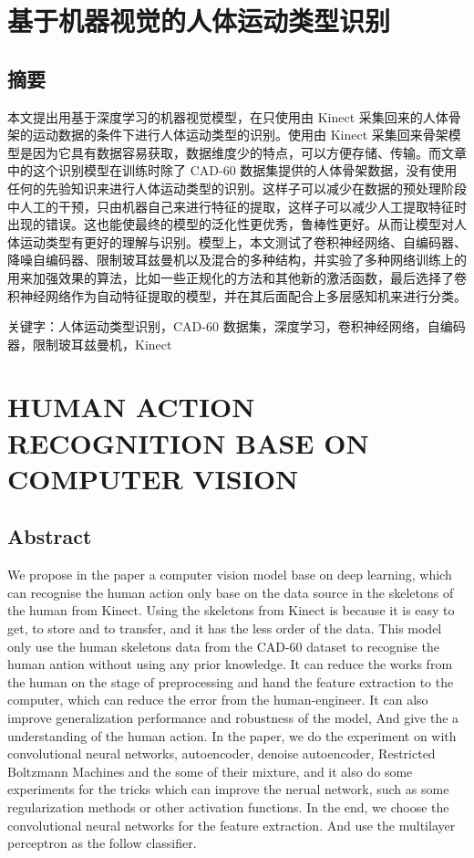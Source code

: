 \section{基于机器视觉的人体运动类型识别}\label{ux57faux4e8eux673aux5668ux89c6ux89c9ux7684ux4ebaux4f53ux8fd0ux52a8ux7c7bux578bux8bc6ux522b}

\subsection{摘要}\label{ux6458ux8981}

本文提出用基于深度学习的机器视觉模型，在只使用由 Kinect
采集回来的人体骨架的运动数据的条件下进行人体运动类型的识别。使用由
Kinect
采集回来骨架模型是因为它具有数据容易获取，数据维度少的特点，可以方便存储、传输。而文章中的这个识别模型在训练时除了
CAD-60
数据集提供的人体骨架数据，没有使用任何的先验知识来进行人体运动类型的识别。这样子可以减少在数据的预处理阶段中人工的干预，只由机器自己来进行特征的提取，这样子可以减少人工提取特征时出现的错误。这也能使最终的模型的泛化性更优秀，鲁棒性更好。从而让模型对人体运动类型有更好的理解与识别。模型上，本文测试了卷积神经网络、自编码器、降噪自编码器、限制玻耳兹曼机以及混合的多种结构，并实验了多种网络训练上的用来加强效果的算法，比如一些正规化的方法和其他新的激活函数，最后选择了卷积神经网络作为自动特征提取的模型，并在其后面配合上多层感知机来进行分类。

关键字：人体运动类型识别，CAD-60
数据集，深度学习，卷积神经网络，自编码器，限制玻耳兹曼机，Kinect

\section{HUMAN ACTION RECOGNITION BASE ON COMPUTER
VISION}\label{human-action-recognition-base-on-computer-vision}

\subsection{Abstract}\label{abstract}

We propose in the paper a computer vision model base on deep learning,
which can recognise the human action only base on the data source in the
skeletons of the human from Kinect. Using the skeletons from Kinect is
because it is easy to get, to store and to transfer, and it has the less
order of the data. This model only use the human skeletons data from the
CAD-60 dataset to recognise the human antion without using any prior
knowledge. It can reduce the works from the human on the stage of
preprocessing and hand the feature extraction to the computer, which can
reduce the error from the human-engineer. It can also improve
generalization performance and robustness of the model, And give the a
understanding of the human action. In the paper, we do the experiment on
with convolutional neural networks, autoencoder, denoise autoencoder,
Restricted Boltzmann Machines and the some of their mixture, and it also
do some experiments for the tricks which can improve the nerual network,
such as some regularization methods or other activation functions. In
the end, we choose the convolutional neural networks for the feature
extraction. And use the multilayer perceptron as the follow classifier.

